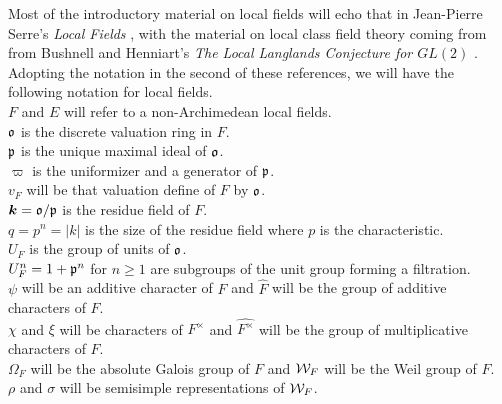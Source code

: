 Most of the introductory material on local fields will echo that in Jean-Pierre Serre's \textit{Local Fields} \cite{Serre1979}, with the material on local class field theory coming from from Bushnell and Henniart's \textit{The Local Langlands Conjecture for $GL(2)$} \cite{Bushnell2006}.
Adopting the notation in the second of these references, we will have the following notation for local fields.\\
$F$ and $E$ will refer to a non-Archimedean local fields.\\
$\mathfrak{o}$ is the discrete valuation ring in $F$.\\
$\mathfrak{p}$ is the unique maximal ideal of $\mathfrak{o}$.\\
$\varpi$ is the uniformizer and a generator of $\mathfrak{p}$.\\
$v_F$ will be that valuation define of $F$ by $\mathfrak{o}$.\\
$\bm{k} = \mathfrak{o}/\mathfrak{p}$ is the residue field of $F$.\\
$q = p^n = |k|$ is the size of the residue field where $p$ is the characteristic.\\
$U_F$ is the group of units of $\mathfrak{o}$.\\
$U_F^n = 1 + \mathfrak{p}^n$ for $n \geq 1$ are subgroups of the unit group forming a filtration.\\
$\psi$ will be an additive character of $F$ and $\widehat{F}$ will be the group of additive characters of $F$. \\
$\chi$ and $\xi$ will be characters of $F^\times$ and $\widehat{F^\times}$ will be the group of multiplicative characters of $F$. \\
$\Omega_F$ will be the absolute Galois group of $F$ and $\mathcal{W}_F$ will be the Weil group of $F$. \\
$\rho$ and $\sigma$ will be semisimple representations of $\mathcal{W}_F$.\\



